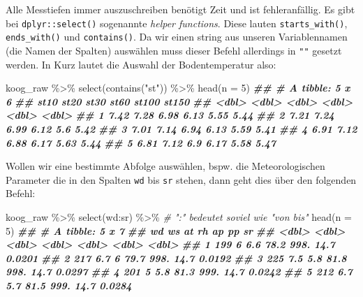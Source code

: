\documentclass[
]{article}
\newenvironment{Shaded}{\begin{snugshade}}{\end{snugshade}}
\newcommand{\AttributeTok}[1]{\textcolor[rgb]{0.77,0.63,0.00}{#1}}
\newcommand{\CommentTok}[1]{\textcolor[rgb]{0.56,0.35,0.01}{\textit{#1}}}
\newcommand{\DecValTok}[1]{\textcolor[rgb]{0.00,0.00,0.81}{#1}}
\newcommand{\DocumentationTok}[1]{\textcolor[rgb]{0.56,0.35,0.01}{\textbf{\textit{#1}}}}
\newcommand{\FunctionTok}[1]{\textcolor[rgb]{0.00,0.00,0.00}{#1}}
\newcommand{\NormalTok}[1]{#1}
\newcommand{\SpecialCharTok}[1]{\textcolor[rgb]{0.00,0.00,0.00}{#1}}
\newcommand{\StringTok}[1]{\textcolor[rgb]{0.31,0.60,0.02}{#1}}
\begin{document}
Alle Messtiefen immer auszuschreiben benötigt Zeit und ist fehleranfällig. Es gibt bei \texttt{dplyr::select()} sogenannte \emph{helper functions}. Diese lauten \texttt{starts\_with()}, \texttt{ends\_with()} und \texttt{contains()}. Da wir einen string aus unseren Variablennamen (die Namen der Spalten) auswählen muss dieser Befehl allerdings in \texttt{""} gesetzt werden. In Kurz lautet die Auswahl der Bodentemperatur also:

\begin{Shaded}
\begin{Highlighting}[]
\NormalTok{koog\_raw }\SpecialCharTok{\%\textgreater{}\%}
  \FunctionTok{select}\NormalTok{(}\FunctionTok{contains}\NormalTok{(}\StringTok{"st"}\NormalTok{)) }\SpecialCharTok{\%\textgreater{}\%}
  \FunctionTok{head}\NormalTok{(}\AttributeTok{n =} \DecValTok{5}\NormalTok{)}
\DocumentationTok{\#\# \# A tibble: 5 x 6}
\DocumentationTok{\#\#    st10  st20  st30  st60 st100 st150}
\DocumentationTok{\#\#   \textless{}dbl\textgreater{} \textless{}dbl\textgreater{} \textless{}dbl\textgreater{} \textless{}dbl\textgreater{} \textless{}dbl\textgreater{} \textless{}dbl\textgreater{}}
\DocumentationTok{\#\# 1  7.42  7.28  6.98  6.13  5.55  5.44}
\DocumentationTok{\#\# 2  7.21  7.24  6.99  6.12  5.6   5.42}
\DocumentationTok{\#\# 3  7.01  7.14  6.94  6.13  5.59  5.41}
\DocumentationTok{\#\# 4  6.91  7.12  6.88  6.17  5.63  5.44}
\DocumentationTok{\#\# 5  6.81  7.12  6.9   6.17  5.58  5.47}
\end{Highlighting}
\end{Shaded}

Wollen wir eine bestimmte Abfolge auswählen, bspw. die Meteorologischen Parameter die in den Spalten \texttt{wd} bis \texttt{sr} stehen, dann geht dies über den folgenden Befehl:

\begin{Shaded}
\begin{Highlighting}[]
\NormalTok{koog\_raw }\SpecialCharTok{\%\textgreater{}\%}
  \FunctionTok{select}\NormalTok{(wd}\SpecialCharTok{:}\NormalTok{sr) }\SpecialCharTok{\%\textgreater{}\%} \CommentTok{\# ":" bedeutet soviel wie "von bis"}
  \FunctionTok{head}\NormalTok{(}\AttributeTok{n =} \DecValTok{5}\NormalTok{)}
\DocumentationTok{\#\# \# A tibble: 5 x 7}
\DocumentationTok{\#\#      wd    ws    at    rh    ap    pp     sr}
\DocumentationTok{\#\#   \textless{}dbl\textgreater{} \textless{}dbl\textgreater{} \textless{}dbl\textgreater{} \textless{}dbl\textgreater{} \textless{}dbl\textgreater{} \textless{}dbl\textgreater{}  \textless{}dbl\textgreater{}}
\DocumentationTok{\#\# 1   199   6     6.6  78.2  998.  14.7 0.0201}
\DocumentationTok{\#\# 2   217   6.7   6    79.7  998.  14.7 0.0192}
\DocumentationTok{\#\# 3   225   7.5   5.8  81.8  998.  14.7 0.0297}
\DocumentationTok{\#\# 4   201   5     5.8  81.3  999.  14.7 0.0242}
\DocumentationTok{\#\# 5   212   6.7   5.7  81.5  999.  14.7 0.0284}
\end{Highlighting}
\end{Shaded}
\end{document}

